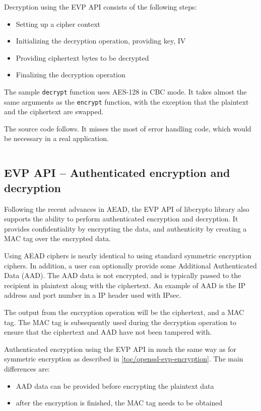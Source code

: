 Decryption using the EVP API consists of the following steps:

\begin{itemize}
  \item Setting up a cipher context
  \item Initializing the decryption operation, providing key, IV
  \item Providing ciphertext bytes to be decrypted
  \item Finalizing the decryption operation
\end{itemize}

The sample \texttt{decrypt} function uses AES-128 in CBC mode. It takes almost the same arguments as the \texttt{encrypt} function, with the exception that the plaintext and the ciphertext are swapped.

The source code follows. It misses the most of error handling code, which would be necessary in a real application.

\inputminted{c}{code/openssl-evp-decrypt.c}


\subsection{EVP API -- Authenticated encryption and decryption}
\label{toc/openssl-evp-aead-encryption}

Following the recent advances in AEAD, the EVP API of libcrypto library also supports the ability to perform authenticated encryption and decryption. It provides confidentiality by encrypting the data, and authenticity by creating a MAC tag over the encrypted data.

Using AEAD ciphers is nearly identical to using standard symmetric encryption ciphers. In addition, a user can optionally provide some Additional Authenticated Data (AAD). The AAD data is not encrypted, and is typically passed to the recipient in plaintext along with the ciphertext. An example of AAD is the IP address and port number in a IP header used with IPsec.

The output from the encryption operation will be the ciphertext, and a MAC tag. The MAC tag is subsequently used during the decryption operation to ensure that the ciphertext and AAD have not been tampered with.

Authenticated encryption using the EVP API in much the same way as for symmetric encryption as described in \autoref{toc/openssl-evp-encryption}. The main differences are:

\begin{itemize}
  \item AAD data can be provided before encrypting the plaintext data
  \item after the encryption is finished, the MAC tag needs to be obtained
\end{itemize}


